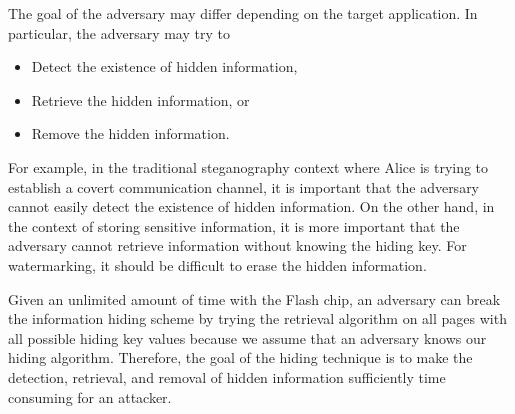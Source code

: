 The goal of the adversary may differ depending on the target application. In particular, the
adversary may try to
\begin{itemize}
\item Detect the existence of hidden information,
\item Retrieve the hidden information, or
\item Remove the hidden information.
\end{itemize}
For example, in the traditional steganography context where Alice is trying to establish 
a covert communication channel, it is important that the adversary cannot easily detect
the existence of hidden information. On the other hand, in the context of storing sensitive
information, it is more important that the adversary cannot retrieve information without
knowing the hiding key. For watermarking, it should be difficult to erase the hidden information.

Given an unlimited amount of time with the Flash chip, an adversary can break the information
hiding scheme by trying the retrieval algorithm on all pages with all possible hiding key values
because we assume that an adversary knows our hiding algorithm.
Therefore, the goal of the hiding technique is to make the detection, retrieval, and removal
of hidden information sufficiently time consuming for an attacker. 






